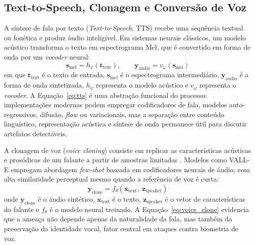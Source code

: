 \documentclass[12pt,a4paper]{article}
\begin{document}
\subsection{Text-to-Speech, Clonagem e Conversão de Voz}

A síntese de fala por texto (\textit{Text-to-Speech}, TTS) recebe uma sequência
textual ou fonética e produz áudio inteligível. Em sistemas neurais clássicos,
um modelo acústico transforma o texto em espectrograma Mel, que é convertido em
forma de onda por um \textit{vocoder} neural:
\begin{equation}
\label{eq:tts}
\mathbf{s}_{\mathrm{mel}} = h_{\psi}(\mathbf{t}_{\mathrm{text}}), \qquad
\mathbf{y}_{\mathrm{audio}} = v_{\omega}(\mathbf{s}_{\mathrm{mel}})
\end{equation}
\noindent
em que $\mathbf{t}_{\mathrm{text}}$ é o texto de entrada,
$\mathbf{s}_{\mathrm{mel}}$ é o espectrograma intermediário,
$\mathbf{y}_{\mathrm{audio}}$ é a forma de onda sintetizada,
$h_{\psi}$ representa o modelo acústico e $v_{\omega}$ representa o
\textit{vocoder}. A Equação~\ref{eq:tts} é uma abstração funcional do processo:
implementações modernas podem empregar codificadores de fala, modelos
auto-regressivos, difusão, \textit{flow} ou variacionais, mas a separação entre
conteúdo linguístico, representação acústica e síntese de onda permanece útil
para discutir artefatos detectáveis.

A clonagem de voz (\textit{voice cloning}) consiste em replicar as
características acústicas e prosódicas de um falante a partir de amostras
limitadas \cite{jia2018}. Modelos como VALL-E \cite{wang2023vall}
empregam abordagem \textit{few-shot} baseada em codificadores neurais de áudio,
com alta similaridade perceptual mesmo quando a referência de voz é curta:
\begin{equation}
\label{eq:voice_clone}
\mathbf{y}_{\mathrm{clone}} = f_{\theta}(\mathbf{x}_{\mathrm{text}},\; \mathbf{z}_{\mathrm{speaker}})
\end{equation}
\noindent
onde $\mathbf{y}_{\mathrm{clone}}$ é o áudio sintético,
$\mathbf{x}_{\mathrm{text}}$ é o texto,
$\mathbf{z}_{\mathrm{speaker}}$ é o vetor de características do falante e $f_{\theta}$ é o
modelo neural treinado. A Equação~\ref{eq:voice_clone} evidencia que a ameaça
não depende apenas da naturalidade da fala, mas também da preservação da
identidade vocal, fator central em ataques contra biometria de voz.
\end{document}
